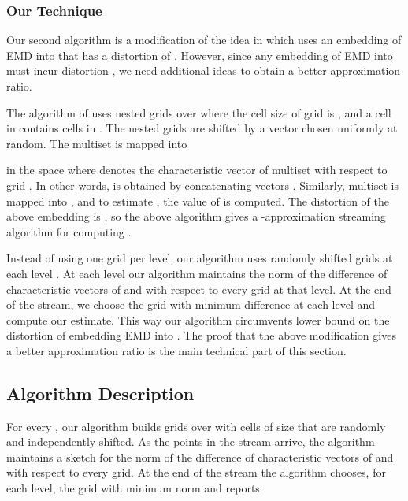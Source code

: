 \documentclass[oribibl]{llncs}
\begin{document}
\subsubsection{Our Technique}
Our second algorithm is a modification of the idea in \cite{ind04}
which uses an embedding of EMD into  that has a distortion of
 \cite{thaper, charikar}.
However, since any embedding of EMD into  must
incur  distortion \cite{naor}, we need additional
ideas to obtain a better approximation ratio.

The algorithm of \cite{ind04} uses nested grids
 over  where the cell size of
grid  is , and a cell in  contains  cells in
. The nested grids are shifted by a vector chosen uniformly at random.
The multiset  is mapped into 

in the  space where
 denotes the characteristic vector of multiset  with respect
to grid . In other words,  is obtained by concatenating vectors
.
Similarly, multiset  is mapped into , and 
to estimate , the value of  is computed.
The distortion of the above embedding is , so 
the above algorithm gives a -approximation streaming algorithm
for computing .

Instead of using one grid per level, our algorithm uses
 randomly shifted grids at each level
. At each level our algorithm maintains the
 norm of the difference of characteristic vectors of  and  with
respect to every grid at that level. At the end of the stream, we choose
the grid with minimum  difference at each level and compute our estimate.
This way our algorithm circumvents  lower bound
on the distortion of embedding EMD into  \cite{naor}.
The proof that the above modification gives a better approximation ratio is the
main technical part of this section.

\subsection{Algorithm Description}
For every , our algorithm builds 
 grids over  with cells of size 
that are randomly and independently shifted. 
As the points in the stream arrive, the algorithm maintains a sketch for
the  norm of the difference of characteristic vectors of  and 
with respect to every grid. At the end of the stream the algorithm chooses, for
each level, the grid with minimum  norm and reports
\end{document}
